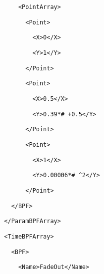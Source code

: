 \documentclass[a4paper,english,american]{book}
\begin{document}
{\begin{spacing}{0.8}
{}
\par
\texttt{\footnotesize ~~~~~~<PointArray>}{\footnotesize\par
}
\par
\texttt{\footnotesize ~~~~~~~~<Point>}{\footnotesize\par
}
\par
\texttt{\footnotesize ~~~~~~~~~~<X>0</X>}{\footnotesize\par
}
\par
\texttt{\footnotesize ~~~~~~~~~~<Y>1</Y>}{\footnotesize\par
}
\par
\texttt{\footnotesize ~~~~~~~~</Point>}{\footnotesize\par
}
\par
\texttt{\footnotesize ~~~~~~~~<Point>}{\footnotesize\par
}
\par
\texttt{\footnotesize ~~~~~~~~~~<X>0.5</X>}{\footnotesize\par
}
\par
\texttt{\footnotesize ~~~~~~~~~~<Y>0.39{*}\# +0.5</Y>}{\footnotesize\par
}
\par
\texttt{\footnotesize ~~~~~~~~</Point>}{\footnotesize\par
}
\par
\texttt{\footnotesize ~~~~~~~~<Point>}{\footnotesize\par
}
\par
\texttt{\footnotesize ~~~~~~~~~~<X>1</X>}{\footnotesize\par
}
\par
\texttt{\footnotesize ~~~~~~~~~~<Y>0.00006{*}\# \textasciicircum{}2</Y>}{\footnotesize\par
}
\par
\texttt{\footnotesize ~~~~~~~~</Point>}{\footnotesize\par
}
\par
\texttt{\footnotesize ~~~~</BPF>}{\footnotesize\par
}
\par
\texttt{\footnotesize ~~</ParamBPFArray>}{\footnotesize\par
}
\par
\texttt{\footnotesize ~~<TimeBPFArray>}{\footnotesize\par
}
\par
\texttt{\footnotesize ~~~~<BPF>}{\footnotesize\par
}
\par
\texttt{\footnotesize ~~~~~~<Name>FadeOut</Name>}{\footnotesize\par
}
\end{spacing}}
\end{document}
